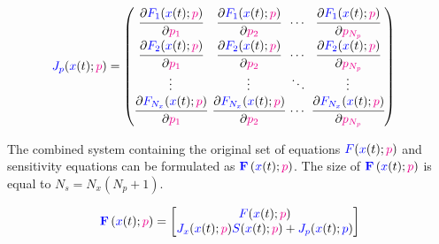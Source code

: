\documentclass[../Article_Model_Parameters.tex]{subfiles}
\begin{document}
	{\footnotesize
		\begin{align}
			{\color{blue}J_p}({\color{blue}x}(t);{\color{magenta}p}) & =
			\begingroup %
			\setlength\arraycolsep{2pt}
			\begin{pmatrix}
				\cfrac{\partial {\color{blue}F_{1}}({\color{blue}x}(t);{\color{magenta}p})}{\partial {\color{magenta}p_{1}}} & \cfrac{\partial {\color{blue}F_{1}}({\color{blue}x}(t);{\color{magenta}p})}{\partial {\color{magenta}p_{2}}} & \cdots & \cfrac{\partial {\color{blue}F_{1}}({\color{blue}x}(t);{\color{magenta}p})}{\partial {\color{magenta}p_{N_p}}}\\
				\cfrac{\partial {\color{blue}F_{2}}({\color{blue}x}(t);{\color{magenta}p})}{\partial {\color{magenta}p_{1}}} & \cfrac{\partial {\color{blue}F_{2}}({\color{blue}x}(t);{\color{magenta}p})}{\partial {\color{magenta}p_{2}}} & \cdots & \cfrac{\partial {\color{blue}F_{2}}({\color{blue}x}(t);{\color{magenta}p})}{\partial {\color{magenta}p_{N_p}}}\\
				\vdots & \vdots & \ddots & \vdots\\
				\cfrac{\partial {\color{blue}F_{N_x}}({\color{blue}x}(t);{\color{magenta}p})}{\partial {\color{magenta}p_{1}}} & \cfrac{\partial {\color{blue}F_{N_x}}({\color{blue}x}(t);{\color{magenta}p})}{\partial {\color{magenta}p_{2}}} & \cdots & \cfrac{\partial {\color{blue}F_{N_x}}({\color{blue}x}(t);{\color{magenta}p})}{\partial {\color{magenta}p_{N_p}}}
			\end{pmatrix}
			\endgroup
	\end{align}}
	
	The combined system containing the original set of equations ${\color{blue}F}({\color{blue}x}(t);{\color{magenta}p})$ and sensitivity equations can be formulated as ${\color{blue}\textbf{F}}\left({\color{blue}x}(t);{\color{magenta}p}\right)$. The size of ${\color{blue}\textbf{F}}\left({\color{blue}x}(t);{\color{magenta}p}\right)$ is equal to $N_s = N_x(N_p + 1)$.
	
	{\footnotesize
		\begin{align}
			{\color{blue}\textbf{F}}\left({\color{blue}x}(t);{\color{magenta}p}\right) = 
			\begin{bmatrix}
				{\color{blue}F}({\color{blue}x}(t);{\color{magenta}p})\\
				{\color{blue}J_x}({\color{blue}x}(t);{\color{magenta}p}){\color{blue}S}({\color{blue}x}(t);{\color{magenta}p}) + {\color{blue}J_p}({\color{blue}x}(t);{\color{blue}p})
			\end{bmatrix}
	\end{align} }
	
\end{document}
